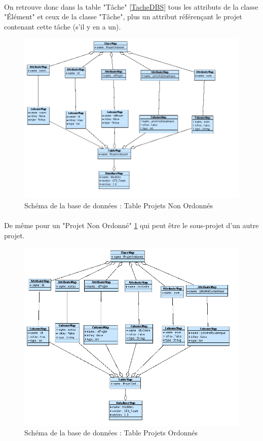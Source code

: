 \paragraph*{}
On retrouve donc dans la table "Tâche" \ref{TacheDBS} tous les attributs de la classe "Élément" et ceux de la classe "Tâche", plus un attribut référençant le projet contenant cette tâche (s'il y en a un).\\


\begin{figure}[htbp]

		\includegraphics[width=18cm]{images/L4/ProjetNonOrdDBS.png}
	\caption{Schéma de la base de données : Table Projets Non Ordonnés}
	\label{ProjetNonOrdDBS}
\end{figure}
\paragraph*{}
De même pour un "Projet Non Ordonné" \ref{ProjetNonOrdDBS} qui peut être le sous-projet d'un autre projet.\\


\begin{figure}[htbp]

		\includegraphics[width=18cm]{images/L4/ProjetOrdDBS.png}
	\caption{Schéma de la base de données : Table Projets Ordonnés}
	\label{ProjetOrdDBS}
\end{figure}
